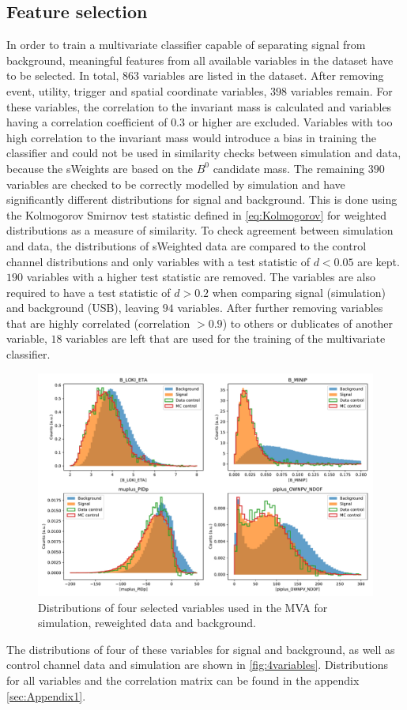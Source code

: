 \subsection{Feature selection}
In order to train a multivariate classifier capable of separating signal from background, meaningful features from all available variables in the dataset 
have to be selected. In total, $\num{863}$ variables are listed in the dataset. After removing event, utility, trigger and spatial coordinate variables, $\num{398}$ variables remain.
For these variables, the correlation to the invariant mass is calculated and variables having a correlation coefficient of $\num{0.3}$ or higher are excluded.
Variables with too high correlation to the invariant mass would introduce a bias in training the classifier and could not be used in similarity checks between simulation and data,
because the sWeights are based on the $B^0$ candidate mass. The remaining $\num{390}$ variables are checked to be correctly modelled by simulation and have significantly different 
distributions for signal and background. This is done using the Kolmogorov Smirnov test statistic defined in \autoref{eq:Kolmogorov} for weighted distributions as a measure of similarity. 
To check agreement between simulation and data, the distributions of sWeighted data are compared to the control channel distributions and 
only variables with a test statistic of $d < \num{0.05}$ are kept. $\num{190}$ variables with a higher test statistic are removed. 
The variables are also required to have a test statistic of $d > \num{0.2}$ when comparing signal (simulation) and background (USB), leaving 
$\num{94}$ variables. After further removing variables that are highly correlated (correlation $> 0.9$) to others or dublicates of another variable, $\num{18}$ variables are 
left that are used for the training of the multivariate classifier.
\begin{figure}
  \centering
  \includegraphics[width = .9\textwidth]{"content/plots/4variables.pdf"}
  \caption{Distributions of four selected variables used in the MVA for simulation, reweighted data and background.}
  \label{fig:4variables}
\end{figure}
The distributions of four of these variables for signal and background, as well as control channel data and simulation are shown in \autoref{fig:4variables}. Distributions for all
variables and the correlation matrix can be found in the appendix \ref{sec:Appendix1}.

